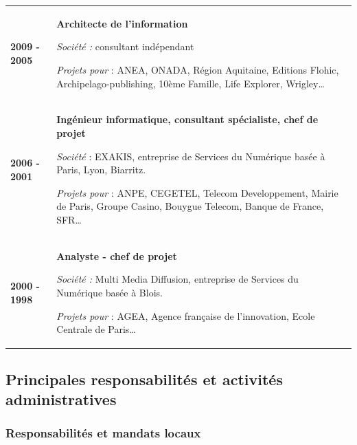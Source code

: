 \documentclass[
  a4paper,
  DIV=11,
  numbers=noendperiod]{scrreprt}
\begin{document}
\begin{longtable}[]{@{}
  >{\raggedright\arraybackslash}p{}
  >{\raggedright\arraybackslash}p{}@{}}
\toprule\noalign{}
\endhead
\bottomrule\noalign{}
\endlastfoot
\textbf{2009 - 2005} & \textbf{Architecte de l'information}

\emph{Société :} consultant indépendant

\emph{Projets pour} : ANEA, ONADA, Région Aquitaine, Editions Flohic,
Archipelago-publishing, 10ème Famille, Life Explorer, Wrigley\ldots{} \\
\textbf{2006 - 2001} & \textbf{Ingénieur informatique, consultant
spécialiste, chef de projet}

\emph{Société} : EXAKIS, entreprise de Services du Numérique basée à
Paris, Lyon, Biarritz.

\emph{Projets pour} : ANPE, CEGETEL, Telecom Developpement, Mairie de
Paris, Groupe Casino, Bouygue Telecom, Banque de France, SFR\ldots{} \\
\textbf{2000 - 1998} & \textbf{Analyste - chef de projet}

\emph{Société :} Multi Media Diffusion, entreprise de Services du
Numérique basée à Blois.

\emph{Projets pour} : AGEA, Agence française de l'innovation, Ecole
Centrale de Paris\ldots{} \\
\end{longtable}

\subsection{Principales responsabilités et activités
administratives}\label{principales-responsabilituxe9s-et-activituxe9s-administratives}

\subsubsection{\texorpdfstring{\textbf{Responsabilités et mandats
locaux}}{Responsabilités et mandats locaux}}\label{responsabilituxe9s-et-mandats-locaux}
\end{document}

